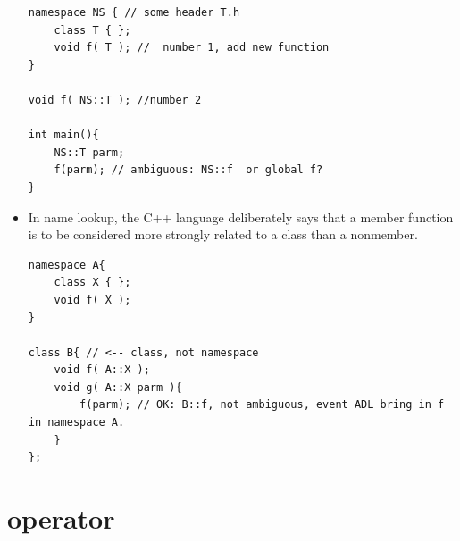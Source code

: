 \documentclass[a4paper,11pt,twoside]{book}
\begin{document}
\begin{itemize}
\begin{lstlisting}[numbers=none]
namespace NS { // some header T.h
	class T { };
	void f( T ); //  number 1, add new function
}

void f( NS::T ); //number 2
	
int main(){
	NS::T parm;
	f(parm); // ambiguous: NS::f  or global f?
}
\end{lstlisting}
	
	
	\item In name lookup, the C++ language deliberately says that a member function is to be considered more strongly related to a class than a nonmember.
\begin{lstlisting}[numbers=none]
namespace A{
	class X { };
	void f( X );
}
	
class B{ // <-- class, not namespace
	void f( A::X );
	void g( A::X parm ){
		f(parm); // OK: B::f, not ambiguous, event ADL bring in f in namespace A.
	}
};
\end{lstlisting}
	
\end{itemize}


\section{operator}
\end{document}
